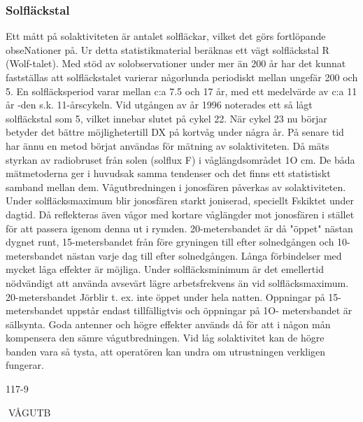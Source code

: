\subsubsection{Solfläckstal}
Ett mått på solaktiviteten är antalet solfläckar, vilket det görs fortlöpande obseNationer på. Ur detta statistikmaterial beräknas
ett vägt solfläckstal R (Wolf-talet). Med stöd
av solobservationer under mer än 200 år har
det kunnat fastställas att solfläckstalet varierar någorlunda periodiskt mellan ungefär
200 och 5.
En solfläcksperiod varar mellan c:a 7.5
och 17 år, med ett medelvärde av c:a 11 år
-den s.k. 11-årscykeln. Vid utgången av år
1996 noterades ett så lågt solfläckstal som
5, vilket innebar slutet på cykel 22.
När cykel 23 nu börjar betyder det bättre
möjlighetertill DX på kortvåg under några år.
På senare tid har ännu en metod börjat
användas för mätning av solaktiviteten. Då
mäts styrkan av radiobruset från solen (solflux F) i våglängdsområdet 1O cm.
De båda mätmetoderna ger i huvudsak
samma tendenser och det finns ett statistiskt
samband mellan dem.
Vågutbredningen i jonosfären påverkas
av solaktiviteten. Under solfläcksmaximum
blir jonosfären starkt joniserad, speciellt Fskiktet under dagtid. Då reflekteras även
vågor med kortare våglängder mot jonosfären i stället för att passera igenom denna ut
i rymden. 20-metersbandet är då "öppet"
nästan dygnet runt, 15-metersbandet från
före gryningen till efter solnedgången och
10-metersbandet nästan varje dag till efter
solnedgången. Långa förbindelser med
mycket låga effekter är möjliga.
Under solfläcksminimum är det emellertid nödvändigt att använda avsevärt lägre
arbetsfrekvens än vid solfläcksmaximum.
20-metersbandet Jörblir t. ex. inte öppet under hela natten. Oppningar på 15-metersbandet uppstår endast tillfälligtvis och öppningar på 1O- metersbandet är sällsynta.
Goda antenner och högre effekter används
då för att i någon mån kompensera den
sämre vågutbredningen. Vid låg solaktivitet
kan de högre banden vara så tysta, att operatören kan undra om utrustningen verkligen
fungerar.

117-9

VÅGUTB

